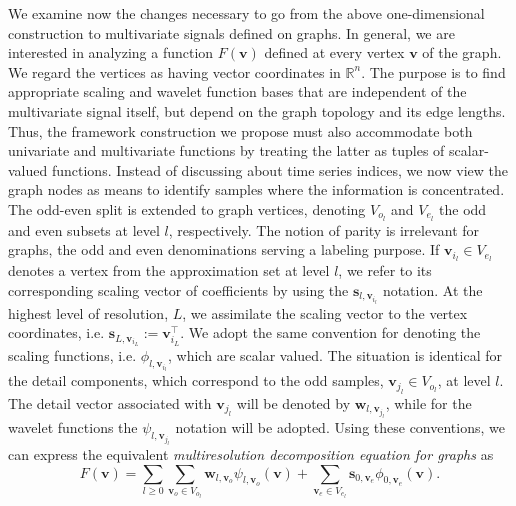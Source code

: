 \documentclass[graybox]{svmult}
\begin{document}
	We examine now the changes necessary to go from the above one-dimensional construction to multivariate signals defined on graphs. In general, we are interested in analyzing a function $F(\mathbf{v})$ defined at every vertex $\mathbf{v}$ of the graph. We regard the vertices as having vector coordinates in $\mathbb{R}^n$. The purpose is to find appropriate scaling and wavelet function bases that are independent of the multivariate signal itself, but depend on the graph topology and its edge lengths. Thus, the framework construction we propose must also accommodate both univariate and multivariate functions by treating the latter as tuples of scalar-valued functions. 
	Instead of discussing about time series indices, we now view the graph nodes as means to identify samples where the information is concentrated.
	The odd-even split is extended to graph vertices, denoting $V_{o_l}$ and $V_{e_l}$
	the odd and even subsets at level $l$, respectively.
	The notion of parity is irrelevant for graphs, the odd and even denominations serving a labeling purpose.
	If $\mathbf{v}_{i_l} \in  {V}_{e_l}$ denotes a vertex from the approximation set at level $l$, we refer to its corresponding scaling vector of coefficients by using the $\mathbf{s}_{l,\mathbf{v}_{i_l}}$ notation. At the highest level of resolution, $L$, we assimilate the scaling vector to the vertex coordinates, i.e. $\mathbf{s}_{L, \mathbf{v}_{i_L}} := \mathbf{v}_{i_L}^\intercal$. We adopt the same convention for denoting the scaling functions, i.e. $\phi_{l,\mathbf{v}_{i_l}}$, which are scalar valued. The situation is identical for the detail components, which correspond to the odd samples, $\mathbf{v}_{j_l} \in V_{o_l}$, at level $l$. The detail vector associated with $\mathbf{v}_{j_l}$ will be denoted by $\mathbf{w}_{l,\mathbf{v}_{j_l}}$, while for the wavelet functions the $\psi_{l,\mathbf{v}_{j_l}}$ notation will be adopted. Using these conventions, we can express the equivalent \emph{multiresolution decomposition equation for graphs} as
	\begin{equation}
	F(\mathbf{v}) = \sum_{l \geq 0 } \sum_{\mathbf{v}_o \in V_{o_l}} \mathbf{w}_{l,\mathbf{v}_o} \psi_{l, \mathbf{v}_o } (\mathbf{v}) + \sum_{\mathbf{v}_e \in V_{e_l} } \mathbf{s}_{0, \mathbf{v}_e} \phi_{0, \mathbf{v}_e}(\mathbf{v}).
	\label{eq_cds:multiresolution_surface}
	\end{equation}
	
\end{document}
